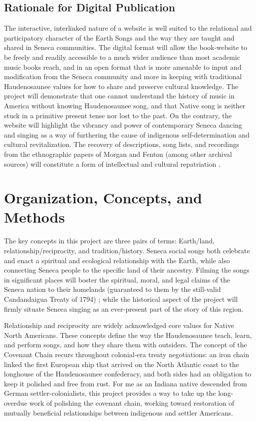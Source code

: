 \documentclass{neh}
\begin{document}
\subsection{Rationale for Digital Publication}

The interactive, interlinked nature of a website is well suited to the
relational and participatory character of the Earth Songs and the way they are
taught and shared in Seneca communities.
The digital format will allow the book-website to be freely and readily
accessible to a much wider audience than most academic music books reach, and
in an open format that is more amenable to input and modification from the
Seneca community and more in keeping with traditional Haudenosaunee values for
how to share and preserve cultural knowledge.
The project will demonstrate that one cannot understand the history of music
in America without knowing Haudenosaunee song, and that Native song is neither 
stuck in a primitive present tense nor lost to the past.
On the contrary, the website will highlight the vibrancy and power of
contemporary Seneca dancing and singing as a way of furthering the cause of
indigenous self-determination and cultural revitalization.
The recovery of descriptions, song lists, and recordings from the ethnographic
papers of Morgan and Fenton (among other archival sources) will constitute a
form of intellectual and cultural repatriation
\Autocite{Fox:Repatriation}.
\clearpage
\section{Organization, Concepts, and Methods}

The key concepts in this project are three pairs of terms: Earth/land,
relationship/reciprocity, and tradition/history.
Seneca social songs both celebrate and enact a spiritual and ecological
relationship with the Earth, while also connecting Seneca people to the
specific land of their ancestry.
Filming the songs in significant places will boster the spiritual, moral, and
legal claims of the Seneca nation to their homelands (guaranteed to them by
the still-valid Candandaigua Treaty of 1794)
\Autocites{Deloria:BrokenTreaties}{BasicCall};
while the historical aspect of the project will firmly situate Seneca singing
as an ever-present part of the story of this region.

Relationship and reciprocity are widely acknowledged core values for Native
North Americans.
These concepts define the way the Haudenosaunee teach, learn, and perform
songs, and how they share them with outsiders.
The concept of the Covenant Chain recurs throughout colonial-era treaty
negotiations: an iron chain linked the first European ship that arrived on the
North Atlantic coast to the longhouse of the Haudenosaunee confederacy, and
both sides had an obligation to keep it polished and free from rust.
For me as an Indiana native descended from German settler-colonialists, this
project provides a way to take up the long-overdue work of polishing the
covenant chain, working toward restoration of mutually beneficial
relationships between indigenous and settler Americans. 
\end{document}
